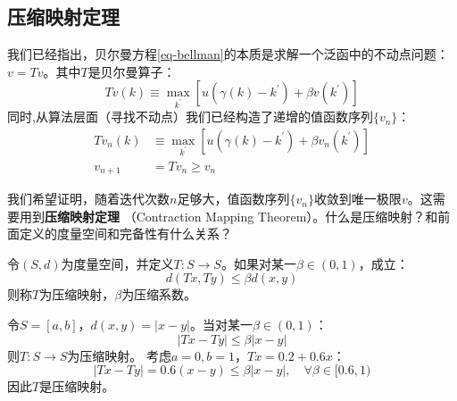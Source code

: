 \subsection{压缩映射定理}

我们已经指出，贝尔曼方程\ref{eq-bellman}的本质是求解一个泛函中的不动点问题：$v=Tv$。其中$T$是贝尔曼算子：
\begin{equation*}
    Tv\left(k\right) \equiv \max_{k^{\prime}} 
        \left[u\left(\gamma\left(k\right)-k^{\prime}\right)+\beta v\left(k^{\prime}\right)\right]
\end{equation*}
同时,从算法层面（寻找不动点）我们已经构造了递增的值函数序列$\{v_n\}$：
\begin{equation*}
    \begin{aligned}
        Tv_n\left(k\right) &\equiv \max _{k^{\prime}} 
            \left[u\left(\gamma\left(k\right)-k^{\prime}\right)+\beta v_n\left(k^{\prime}\right)\right] \\
        v_{n+1} &= Tv_n \geq v_n
    \end{aligned}
\end{equation*}

我们希望证明，随着迭代次数$n$足够大，值函数序列$\{v_n\}$收敛到唯一极限$v$。这需要用到\textbf{压缩映射定理}
（Contraction Mapping Theorem）。什么是压缩映射？和前面定义的度量空间和完备性有什么关系？

\begin{definition}
    令$\left(S,d\right)$为度量空间，并定义$T:S\rightarrow S$。如果对某一$\beta \in \left(0,1\right)$，成立：
    \begin{equation*}
        d\left(Tx,Ty\right) \leq \beta d\left(x,y\right)
    \end{equation*}
    则称$T$为压缩映射，$\beta$为压缩系数。
\end{definition}
\begin{example}
    令$S=\left[a,b\right]$，$d\left(x,y\right)=\left|x-y\right|$。当对某一$\beta \in \left(0,1\right)$：
    \begin{equation*}
        \left|Tx-Ty\right|\leq \beta \left|x-y\right|
    \end{equation*}
    则$T:S\rightarrow S$为压缩映射。
    考虑$a=0,b=1$，$Tx=0.2+0.6x$：
    \begin{equation*}
            \left|Tx-Ty\right|=0.6\left(x-y\right)\leq \beta\left|x-y\right|,\quad \forall \beta \in [0.6,1)
    \end{equation*}
    因此$T$是压缩映射。
\end{example}

